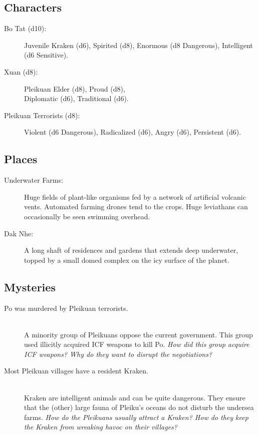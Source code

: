 \documentclass[11pt, a5paper, parskip=half-, DIV=12]{scrartcl}
\begin{document}
\newpage

\subsection*{Characters}
\begin{description}
	\item[Bo Tat (d10):] Juvenile Kraken (d6), Spirited (d8), Enormous (d8 Dangerous), Intelligent (d6 Sensitive).
	\item[Xuan (d8):] Pleikuan Elder (d8), Proud (d8), \\ Diplomatic (d6), Traditional (d6).
	\item[Pleikuan Terrorists (d8):] Violent (d6 Dangerous), Radicalized (d6), Angry (d6), Persistent (d6).
\end{description}

\subsection*{Places}
\begin{description}
	\item[Underwater Farms:] Huge fields of plant-like organisms fed by a network of artificial volcanic vents. Automated farming drones tend to the crops. Huge leviathans can occasionally be seen swimming overhead.
	\item[Dak Nhe:] A long shaft of residences and gardens that extends deep underwater, topped by a small domed complex on the icy surface of the planet.
\end{description}

\subsection*{Mysteries}
\begin{description}
	\item[Po was murdered by Pleikuan terrorists.] \phantom{a} \\ A minority group of Pleikuans oppose the current government. This group used illicitly acquired ICF weapons to kill Po. \textit{How did this group acquire ICF weapons? Why do they want to disrupt the negotiations?}
	\item[Most Pleikuan villages have a resident Kraken.] \phantom{a} \\ Kraken are intelligent animals and can be quite dangerous. They ensure that the (other) large fauna of Pleiku's oceans do not disturb the undersea farms. \textit{How do the Pleikuans usually attract a Kraken? How do they keep the Kraken from wreaking havoc on their villages?}
\end{description}
\end{document}
